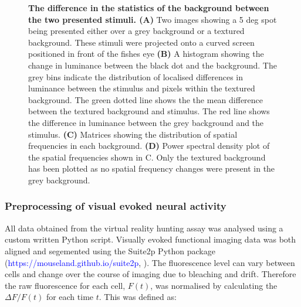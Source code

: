 \begin{figure}[!htb]
        \caption[\label{m1} \textbf{The difference in the statistics of the background between the two presented stimuli.}]{\label{fig:m1} \textbf{The difference in the statistics of the background between the two presented stimuli.  (A)} Two images showing a 5 deg spot being presented either over a grey background or a textured background. These stimuli were projected onto a curved screen positioned in front of the fishes eye \textbf{(B)} A histogram showing the change in luminance between the black dot and the background. The grey bins indicate the distribution of localised differences in luminance between the stimulus and pixels within the textured background. The green dotted line shows the the mean difference between the textured background and stimulus. The red line shows the difference in luminance between the grey background and the stimulus.  \textbf{(C)} Matrices showing the distribution of spatial frequencies in each background. \textbf{(D)} Power spectral density plot of the spatial frequencies shown in C. Only the textured background has been plotted as no spatial frequency changes were present in the grey background.}
      \end{figure}

\subsubsection{Preprocessing of visual evoked neural activity}
All data obtained from the virtual reality hunting assay was analysed using a custom written Python script. Visually evoked functional imaging data was both aligned and segemented using the Suite2p Python package (\textcolor{blue}{https://mouseland.github.io/suite2p}, \cite{Pachitariu2016Suite2p:Microscopy}).  The fluorescence level can vary between cells and change over the course of imaging due to bleaching and drift. Therefore the raw fluorescence for each cell, $F(t)$, was  normalised by calculating the $\Delta F/F(t)$ for each time $t$. This was defined as:

